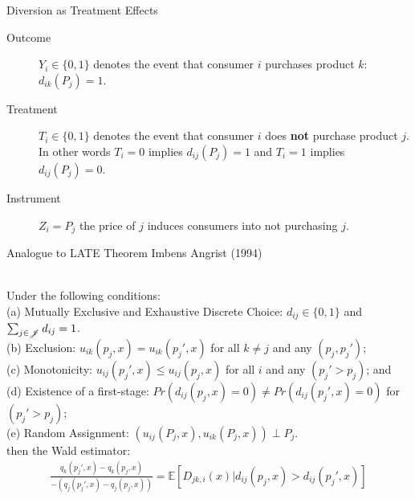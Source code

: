 \documentclass[aspectratio=169,10pt]{beamer}
\begin{document}
\begin{frame}{Diversion as Treatment Effects}
\begin{description}
\item[Outcome] $Y_i \in \{0,1\}$ denotes the event that consumer $i$ purchases product $k$: $d_{ik}(P_j)=1$.
\item[Treatment] $T_i \in \{0,1\}$ denotes the event that consumer $i$ does \textbf{not} purchase product $j$. In other words $T_i = 0$ implies $d_{ij}(P_j)=1$ and $T_i=1$ implies $d_{ij}(P_j)=0$.
\item[Instrument] $Z_i = P_j$ the price of $j$ induces consumers into not purchasing $j$.
\end{description}
\end{frame}




\begin{frame}{Analogue to LATE Theorem Imbens Angrist (1994)}
\begin{theorem}\ \\
\label{prop:late}
Under the following conditions:\\ 
(a) Mutually Exclusive and Exhaustive Discrete Choice: $d_{ij} \in \{0,1\}$ and $\sum_{j \in \mathscr{J}} d_{ij}=1$.\\
(b) Exclusion: $u_{ik}(p_j,x)=u_{ik}(p_j',x)$ for all $k \neq j$ and any $(p_j, p_j')$; \\
(c) Monotonicity: $u_{ij}(p_j',x) \leq u_{ij}(p_j,x)$ for all $i$ and any $(p_j' > p_{j})$; and \\
(d) Existence of a first-stage: $Pr(d_{ij}(p_j,x)=0) \neq Pr(d_{ij}(p_j',x)=0) $ for $(p_j' > p_{j})$; \\
(e) Random Assignment: $(u_{ij}(P_j,x),u_{ik}(P_j,x)) \perp P_j$. \\
\noindent
then the Wald estimator:
\begin{align*}
 \frac{q_k(p_j',x) - q_k(p_j,x)}{-\left(q_j(p_j',x) - q_j(p_j,x)\right)}=\mathbb{E}[D_{jk,i}(x) | d_{ij}(p_j,x) > d_{ij}(p_j',x)]
\end{align*}
\end{theorem}
\end{frame}
\end{document}
